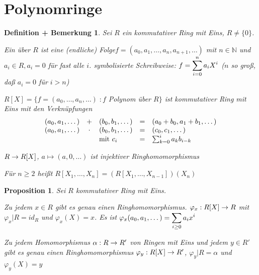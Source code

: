 \documentclass[a4paper,10pt,german]{scrbook}
\theoremstyle{saetze}
\theoremstyle{definitionen}
\newtheorem{DefBem}[Def]{Definition + Bemerkung}
\newtheorem{Prop}[Def]{Proposition}
\begin{document}
\section{Polynomringe}

\begin{DefBem}
Sei $R$ ein kommutativer Ring
mit Eins, $R \neq \{0\}$.
\begin{enum}
\item Ein  über $R$ ist eine (endliche) Folge\medskip\newline $f=(a_0,
a_1,\dots, a_n,a_{n+1},\dots)$ mit $n \in \mathbb{N}$ und $a_i \in
R, a_i = 0$ für fast alle $i$.
\newline symbolisierte Schreibweise: $\displaystyle f=\sum_{i=0}^n a_i X^i$
\newline($n$ so groß, daß $a_i = 0$ für $i > n$)
\item $R[X] = \{f = (a_0,\dots,a_n,\dots)\;: f$ Polynom über $R\}$
ist kommutativer Ring mit Eins mit den Verknüpfungen
\[\begin{array}{lclcl}
(a_0,a_1,\dots)& + &(b_0,b_1,\dots)& = &(a_0+b_0,a_1+b_1,\dots) \\
(a_0,a_1,\dots)& \cdot &(b_0, b_1,\dots)& = &(c_0, c_1,\dots) \\
&&\mbox{mit } c_i & =& \sum_{k=0}^i a_k b_{i-k}\end{array}\]
\item $R \rightarrow R[X]$, $a \mapsto (a,0,\dots)$ ist injektiver
Ringhomomorphismus
\item Für $n \geq 2$ heißt $R[X_1,\dots,X_n] =
(R[X_1,\dots,X_{n-1}])(X_n)$ \newline{}
\end{enum}
\end{DefBem}

\begin{Prop}
Sei $R$ kommutativer Ring mit Eins.
\begin{enum}
\item Zu jedem $x \in R$ gibt es genau einen Ringhomomorphismus.
$\varphi_x: R[X] \rightarrow R$ mit $\varphi_x|R = id_R$ und $\varphi_x(X) =
x$. Es ist $\displaystyle \varphi_x(a_0, a_1, \dots) = \sum_{i\geq 0} a_i x^i$
\item Zu jedem Homomorphismus $\alpha: R \rightarrow R'$ von Ringen mit Eins
und jedem $y \in R'$ gibt es genau einen Ringhomomorphismus
$\varphi_y:R[X]\rightarrow R'$, $\varphi_y|R = \alpha$ und $\varphi_y(X) =
y$
\end{enum}
\end{Prop}
\end{document}

